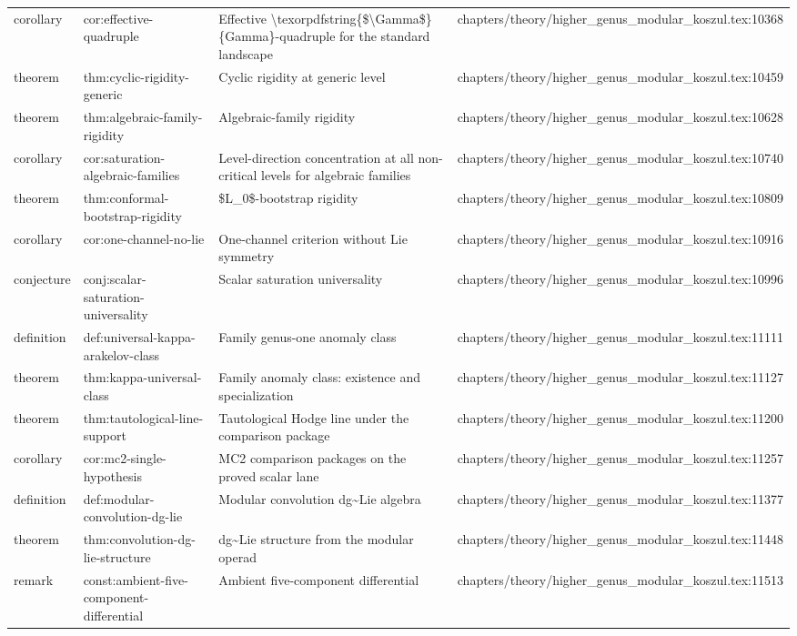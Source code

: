 \documentclass[11pt]{article}
\begin{document}
\begin{longtable}{L{0.10\textwidth}L{0.26\textwidth}L{0.42\textwidth}L{0.22\textwidth}}
corollary & cor:effective-quadruple & Effective \textbackslash{}texorpdfstring\{\$\textbackslash{}Gamma\$\}\{Gamma\}-quadruple for the standard landscape & chapters/theory/higher\_genus\_modular\_koszul.tex:10368\\
theorem & thm:cyclic-rigidity-generic & Cyclic rigidity at generic level & chapters/theory/higher\_genus\_modular\_koszul.tex:10459\\
theorem & thm:algebraic-family-rigidity & Algebraic-family rigidity & chapters/theory/higher\_genus\_modular\_koszul.tex:10628\\
corollary & cor:saturation-algebraic-families & Level-direction concentration at all non-critical levels for algebraic families & chapters/theory/higher\_genus\_modular\_koszul.tex:10740\\
theorem & thm:conformal-bootstrap-rigidity & \$L\_0\$-bootstrap rigidity & chapters/theory/higher\_genus\_modular\_koszul.tex:10809\\
corollary & cor:one-channel-no-lie & One-channel criterion without Lie symmetry & chapters/theory/higher\_genus\_modular\_koszul.tex:10916\\
conjecture & conj:scalar-saturation-universality & Scalar saturation universality & chapters/theory/higher\_genus\_modular\_koszul.tex:10996\\
definition & def:universal-kappa-arakelov-class & Family genus-one anomaly class & chapters/theory/higher\_genus\_modular\_koszul.tex:11111\\
theorem & thm:kappa-universal-class & Family anomaly class: existence and specialization & chapters/theory/higher\_genus\_modular\_koszul.tex:11127\\
theorem & thm:tautological-line-support & Tautological Hodge line under the comparison package & chapters/theory/higher\_genus\_modular\_koszul.tex:11200\\
corollary & cor:mc2-single-hypothesis & MC2 comparison packages on the proved scalar lane & chapters/theory/higher\_genus\_modular\_koszul.tex:11257\\
definition & def:modular-convolution-dg-lie & Modular convolution dg\textasciitilde{}Lie algebra & chapters/theory/higher\_genus\_modular\_koszul.tex:11377\\
theorem & thm:convolution-dg-lie-structure & dg\textasciitilde{}Lie structure from the modular operad & chapters/theory/higher\_genus\_modular\_koszul.tex:11448\\
remark & const:ambient-five-component-differential & Ambient five-component differential & chapters/theory/higher\_genus\_modular\_koszul.tex:11513\\

\end{longtable}
\end{document}
